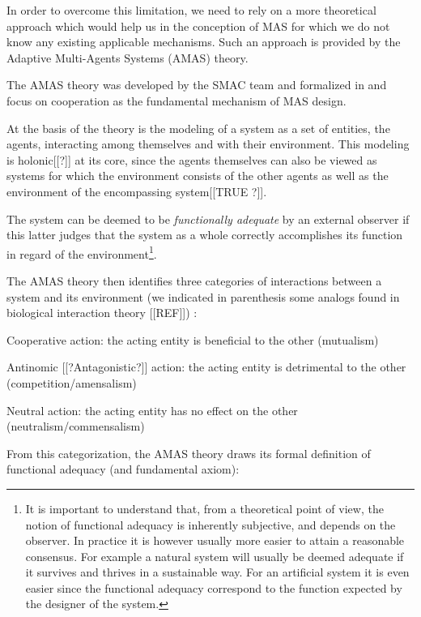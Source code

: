 In order to overcome this limitation, we need to rely on a more theoretical approach which would help us in the conception of MAS for which we do not know any existing applicable mechanisms. Such an approach is provided by the Adaptive Multi-Agents Systems (AMAS) theory.

The AMAS theory was developed by the SMAC team and formalized in \cite{glize2001adaptation} and focus on cooperation as the fundamental mechanism of MAS design.

At the basis of the theory is the modeling of a system as a set of entities, the agents, interacting among themselves and with their environment. This modeling is holonic[[?]] at its core, since the agents themselves can also be viewed as systems for which the environment consists of the other agents as well as the environment of the encompassing system[[TRUE ?]].


The system can be deemed to be \emph{functionally adequate} by an external observer if this latter judges that the system as a whole correctly accomplishes its function in regard of the environment\footnote{It is important to understand that, from a theoretical point of view, the notion of functional adequacy is inherently subjective, and depends on the observer. In practice it is however usually more easier to attain a reasonable consensus. For example a natural system will usually be deemed adequate if it survives and thrives in a sustainable way. For an artificial system it is even easier since the functional adequacy correspond to the function expected by the designer of the system.}.

The AMAS theory then identifies three categories of interactions between a system and its environment (we indicated in parenthesis some analogs found in biological interaction theory [[REF]]) :
\begin{compactitem}
\item Cooperative action: the acting entity is beneficial to the other (mutualism)
\item Antinomic [[?Antagonistic?]] action: the acting entity is detrimental to the other (competition/amensalism)
\item Neutral action: the acting entity has no effect on the other (neutralism/commensalism)
\end{compactitem}

From this categorization, the AMAS theory draws its formal definition of functional adequacy (and fundamental axiom):


